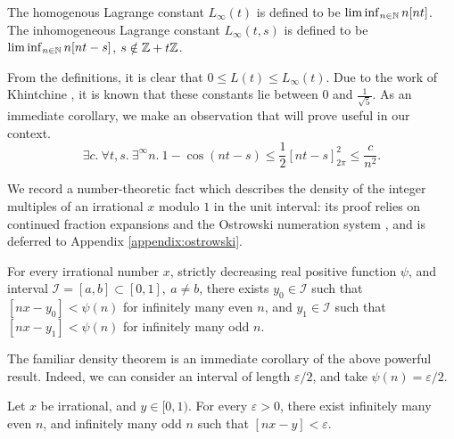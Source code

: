 \begin{definition}
\label{def:Linfty}
The homogenous Lagrange constant $L_\infty(t)$ is defined to be $\liminf_{n \in \mathbb{N}} n[nt]$. The inhomogeneous Lagrange constant $L_\infty(t, s)$ is defined to be\\ $\liminf_{n \in \mathbb{N}} n[nt - s]$, $s \notin \mathbb{Z} + t\mathbb{Z}$.
\end{definition} 

From the definitions, it is clear that $0 \le L(t) \le L_\infty(t)$. Due to the work of Khintchine \cite{khintchine}, it is known that these constants lie between $0$ and $\frac{1}{\sqrt{5}}$. As an immediate corollary, we make an observation that will prove useful in our context.
\begin{equation}
\label{eq:quadraticdecay}
\exists c.~\forall t, s.~ \exists^\infty n. ~ 1 - \cos(nt - s) \le \frac{1}{2}\left[nt - s \right]_{2\pi}^2 \le \frac{c}{n^2}.
\end{equation}

We record a number-theoretic fact which describes the density of the integer multiples of an irrational $x$ modulo $1$ in the unit interval: its proof relies on continued fraction expansions and the Ostrowski numeration system \cite{bourla2016ostrowski,berthe2022dynamics}, and is deferred to Appendix \ref{appendix:ostrowski}.
\begin{lemma}
\label{lemma:existsreal}
For every irrational number $x$, strictly decreasing real positive function $\psi$, and interval $\mathcal{I} = [a, b] \subset [0, 1], ~ a \ne b$, there exists $y_0 \in \mathcal{I}$ such that $[nx - y_0] < \psi(n)$ for infinitely many even $n$, and $y_1 \in \mathcal{I}$ such that $[nx - y_1] < \psi(n)$ for infinitely many odd $n$.
\end{lemma}

The familiar density theorem is an immediate corollary of the above powerful result. Indeed, we can consider an interval of length $\varepsilon/2$, and take $\psi(n) = \varepsilon/2$.
\begin{lemma}
\label{lemma:density}
Let $x$ be irrational, and $y \in [0, 1)$. For every $\varepsilon > 0$, there exist infinitely many even $n$, and infinitely many odd $n$ such that $[nx - y] < \varepsilon$.
\end{lemma}

